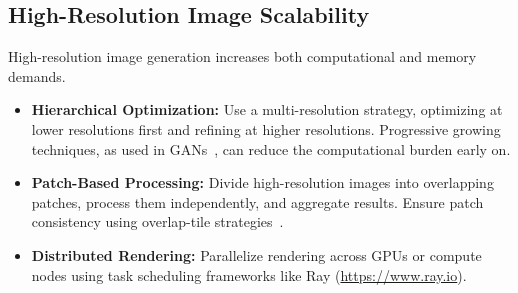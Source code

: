 \subsection{High-Resolution Image Scalability}
High-resolution image generation increases both computational and memory demands.

\begin{itemize}
    \item \textbf{Hierarchical Optimization:}
    Use a multi-resolution strategy, optimizing at lower resolutions first and refining at higher resolutions. Progressive growing techniques, as used in GANs~\cite{karras2017progressive}, can reduce the computational burden early on.

    \item \textbf{Patch-Based Processing:}
    Divide high-resolution images into overlapping patches, process them independently, and aggregate results. Ensure patch consistency using overlap-tile strategies~\cite{ronneberger2015u}.

    \item \textbf{Distributed Rendering:}
    Parallelize rendering across GPUs or compute nodes using task scheduling frameworks like Ray (\url{https://www.ray.io}).
\end{itemize}


